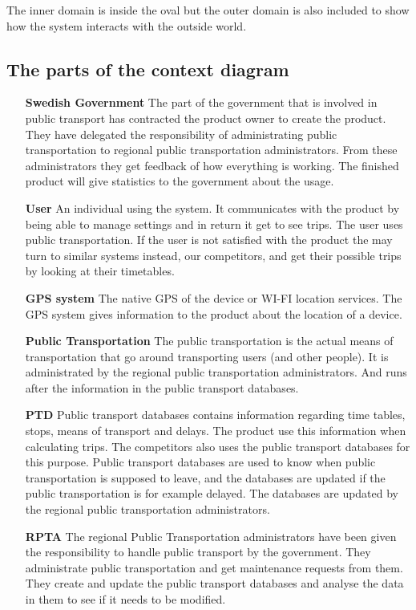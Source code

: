 \documentclass[a4paper]{article}
\begin{document}
		 The inner domain is inside the oval but the outer domain is also included to show how the system interacts with the outside world.
	\subsection{The parts of the context diagram}			
		\begin{itemize}

			\item[\textbf{Swedish Government}] The part of the government that is involved in public transport has contracted the product owner to create the product. They have delegated the responsibility of administrating public transportation to regional public transportation administrators. From these administrators they get feedback of how everything is working. The finished product will give statistics to the government about the usage.
			\item[\textbf{User}] An individual using the system. It communicates with the product by being able to manage settings and in return it get to see trips. The user uses public transportation. If the user is not satisfied with the product the may turn to similar systems instead, our competitors, and get their possible trips by looking at their timetables.
			\item[\textbf{GPS system}] The native GPS of the device or WI-FI location services. The GPS system gives information to the product about the location of a device.
			\item[\textbf{Public Transportation}] The public transportation is the actual means of transportation that go around transporting users (and other people). It is administrated by the regional public transportation administrators. And runs after the information in the public transport databases.
			\item[\textbf{PTD}] Public transport databases contains information regarding time tables, stops, means of transport and delays. The product use this information when calculating trips. The competitors also uses the public transport databases for this purpose. Public transport databases are used to know when public transportation is supposed to leave, and the databases are updated if the public transportation is for example delayed. The databases are updated by the regional public transportation administrators.
			\item[\textbf{RPTA}] The regional Public Transportation administrators have been given the responsibility to handle public transport by the government. They administrate public transportation and get maintenance requests from them. They create and update the public transport databases and analyse the data in them to see if it needs to be modified.
			

\end{itemize}
\end{document}
